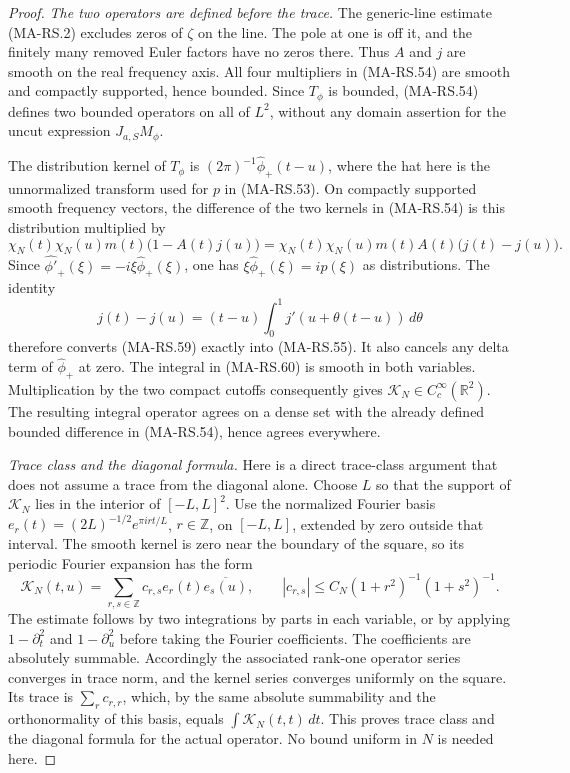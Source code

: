 \begin{proof}
\emph{The two operators are defined before the trace.}
The generic-line estimate (MA-RS.2) excludes zeros of $\zeta$
on the line. The pole at one is off it, and the finitely many
removed Euler factors have no zeros there. Thus $A$ and $j$
are smooth on the real frequency axis. All four multipliers
in (MA-RS.54) are smooth and compactly supported, hence bounded.
Since $T_\phi$ is bounded, (MA-RS.54) defines two bounded
operators on all of $L^2$, without any domain assertion for
the uncut expression $J_{a,S}M_\phi$.

The distribution kernel of $T_\phi$ is
$(2\pi)^{-1}\widehat\phi_+(t-u)$, where the hat here is the
unnormalized transform used for $p$ in (MA-RS.53).
On compactly supported smooth frequency vectors, the difference
of the two kernels in (MA-RS.54) is this distribution multiplied
by
\[
 \chi_N(t)\chi_N(u)m(t)\bigl(1-A(t)j(u)\bigr)
  =\chi_N(t)\chi_N(u)m(t)A(t)\bigl(j(t)-j(u)\bigr).
 \tag{MA-RS.59}
\]
Since $\widehat{\phi'}_+(\xi)=-i\xi\widehat\phi_+(\xi)$,
one has $\xi\widehat\phi_+(\xi)=ip(\xi)$ as distributions.
The identity
\[
 j(t)-j(u)=(t-u)\int_0^1j'(u+\theta(t-u))\,d\theta
 \tag{MA-RS.60}
\]
therefore converts (MA-RS.59) exactly into (MA-RS.55).
It also cancels any delta term of $\widehat\phi_+$ at zero.
The integral in (MA-RS.60) is smooth in both variables.
Multiplication by the two compact cutoffs consequently gives
$\mathcal K_N\in C_c^\infty(\mathbb R^2)$.
The resulting integral operator agrees on a dense set with
the already defined bounded difference in (MA-RS.54), hence
agrees everywhere.

\emph{Trace class and the diagonal formula.}
Here is a direct trace-class argument that does not assume a
trace from the diagonal alone. Choose $L$ so that the support
of $\mathcal K_N$ lies in the interior of $[-L,L]^2$.
Use the normalized Fourier basis
$e_r(t)=(2L)^{-1/2}e^{\pi irt/L}$, $r\in\mathbb Z$,
on $[-L,L]$, extended by zero outside that interval.
The smooth kernel is zero near the boundary of the square, so
its periodic Fourier expansion has the form
\[
 \mathcal K_N(t,u)=\sum_{r,s\in\mathbb Z}
              c_{r,s}e_r(t)\overline{e_s(u)},\qquad
 |c_{r,s}|\le
       C_N(1+r^2)^{-1}(1+s^2)^{-1}.
 \tag{MA-RS.61}
\]
The estimate follows by two integrations by parts in each
variable, or by applying $1-\partial_t^2$ and
$1-\partial_u^2$ before taking the Fourier coefficients.
The coefficients are absolutely summable. Accordingly the
associated rank-one operator series converges in trace norm,
and the kernel series converges uniformly on the square.
Its trace is $\sum_r c_{r,r}$, which, by the same absolute
summability and the orthonormality of this basis, equals
$\int\mathcal K_N(t,t)\,dt$.
This proves trace class and the diagonal formula for the
actual operator. No bound uniform in $N$ is needed here.


\end{proof}
